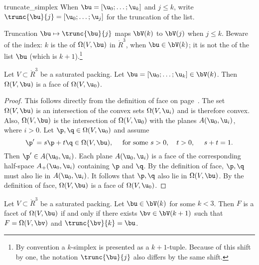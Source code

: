 \begin{notation}[$\trunc{\bu}{j}$]
%
 {truncate\_simplex}
\hspace{-3pt}
When $\bu=[\u_0;\ldots;\u_k]$ and $j\le k$, write
$\trunc{\bu}{j} = 
[\u_0;\ldots;\u_j]$ for the truncation of the list.  
\end{notation}

Truncation $\bu\mapsto\trunc{\bu}{j}$ maps $\bV(k)$ to $\bV(j)$ when
$j\le k$.  Beware of the index: $k$ is the  of
$\Omega(V,\bu)$ in $\ring{R}^3$, when $\bu\in \bV(k)$; it is not the
 of the list $\bu$ (which is $k+1$).\footnote{By
  convention a $k$-simplex is presented as a $k+1$-tuple.  Because of
  this shift by one, the notation $\trunc{\bu}{j}$ also differs by the
  same shift.}


\begin{lemma}\label{lemma:omega-face}  
Let $V\subset\ring{R}^3$ be a saturated packing.
Let $\bu=[\u_0;\ldots;\u_{k}]\in \bV(k)$.  
Then $\Omega(V,\bu)$ is a face of $\Omega(V,\u_0)$.
\end{lemma}

\begin{proof} This follows directly from the definition of face on
  page~\pageref{def:face}.  The set $\Omega(V,\bu)$ is
an intersection of the convex sets $\Omega(V,\u_i)$ and
is therefore convex.  Also,  $\Omega(V,\bu)$ is the intersection of
  $\Omega(V,\u_0)$ with the planes $A(\u_0,\u_i)$, where $i>0$.  
 Let $\p,\q\in\Omega(V,\u_0)$ and
  assume
\[  
\p' = s \p + t \q\in\Omega(V,\bu),\quad 
\text{ for some } s>0,\quad t>0,~\quad s + t = 1.
\]  
Then $\p'\in A(\u_0,\u_i)$.  Each plane $A(\u_0,\u_i)$ is a face of
the corresponding half-space $A_+(\u_0,\u_i)$ containing $\p$ and
$\q$.  By the definition of face, $\p,\q$ must also lie in
$A(\u_0,\u_i)$.  It follows that $\p,\q$ also lie in $\Omega(V,\bu)$.
By the definition of face, $\Omega(V,\bu)$ is a face of
$\Omega(V,\u_0)$.
\end{proof}

\begin{lemma}[facets]\label{lemma:omega-facet} 
  Let $V\subset\ring{R}^3$ be a saturated packing.  Let $\bu\in
  \bV(k)$ for some $k<3$.  Then $F$ is a facet of $\Omega(V,\bu)$ if
  and only if there exists $\bv\in \bV(k+1)$ such that $F =
  \Omega(V,\bv)$ and $\trunc{\bv}{k} = \bu$.
\end{lemma}


